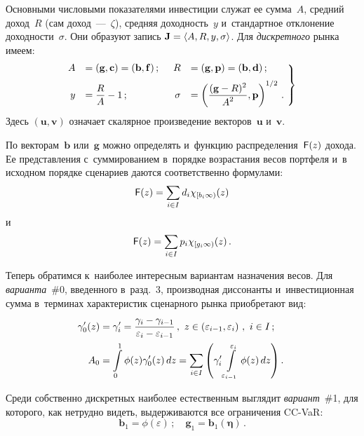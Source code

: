 \begin{multicols}{2}
  Основными числовыми показателями инвестиции служат ее сумма~$A$, 
средний доход~$R$ (сам доход~---~$\zeta$), средняя доходность~$y$ 
и~стандартное отклонение доходности~$\sigma$. Они образуют запись 
$\mathbf{J}\hm= \langle A, R, y, \sigma\rangle$. Для \textit{дискретного} рынка 
имеем: 
  \begin{equation}
  \left.
 \hspace*{-3mm} \begin{array}{rlrl}
  A&=(\mathbf{g},\mathbf{c})= (\mathbf{b},\mathbf{f})\,;&\enskip
  R&=(\mathbf{g},\mathbf{p})=(\mathbf{b},\mathbf{d})\,;\\[6pt]
  y&=\displaystyle\fr{R}{A}-1\,;&\enskip 
  \sigma&=\left( \fr{(\mathbf{g} -R)^2}{A^2},\mathbf{p}\right)^{1/2}\,.
  \end{array}\!
  \right\}\!
  \label{e6-ag}
  \end{equation}
Здесь $(\mathbf{u},\mathbf{v})$ означает скалярное произведение 
векторов~$\mathbf{u}$ и~$\mathbf{v}$. 
  
  По векторам~$\mathbf{b}$ или~$\mathbf{g}$ можно определять и~функцию 
распределения~${\sf F}(z)$ дохода. Ее представления с~суммированием 
в~порядке возрастания весов портфеля и~в исходном порядке сценариев даются 
соответственно формулами:
  $$
  {\sf F}(z)=\sum\limits_{i\in I} d_i \chi_{[b_i\infty)}(z)
  $$
  и
  $$
  {\sf F}(z)=\sum\limits_{i\in I} p_i \chi_{[g_i\infty)}(z)\,.
  $$
  
  Теперь обратимся к~наиболее интересным ва\-риантам назначения весов. Для 
\textit{варианта}~\#0, вве\-денного в~разд.~3, производная диссонанты 
и~ин\-вестиционная сумма в~терминах характеристик сценарно\-го рынка 
приобретают вид: 
  \begin{align}
  \hspace*{-1mm}\gamma_0^\prime(z) &= \gamma_i^\prime =\displaystyle\frac{\displaystyle \gamma_i-\gamma_{i-1}\mathstrut}{\displaystyle \varepsilon_i-\varepsilon_{i-1}\mathstrut}\,,\ z\in \left( \varepsilon_{i-
1},\varepsilon_i\right)\,,\ i\in I\,;\label{e7-ag}\\
   \hspace*{-1mm} A_0 &= \int\limits_0^1\phi(z)\gamma_0^\prime(z)\,dz=\sum\limits_{i\in I} \left( 
\gamma_i^\prime \int\limits_{\varepsilon_{i-1}}^{\varepsilon_i} 
\phi(z)\,dz\right).\label{e8-ag}
  \end{align}
  
  Среди собственно дискретных наиболее естественным выглядит 
\textit{вариант}~\#1, для которого, как нетрудно видеть, выдерживаются все 
ограничения CC-VaR: 
  \begin{equation}
  \mathbf{b}_1=\phi(\varepsilon)\,;\quad 
\mathbf{g}_1=\mathbf{b}_1(\boldsymbol{\eta})\,.
  \label{e9-ag}
  \end{equation}
  

\end{multicols}
